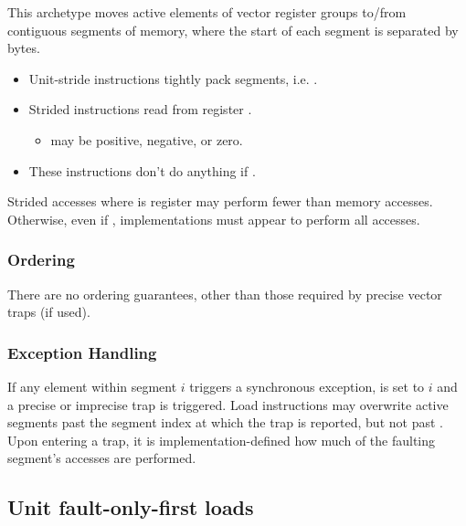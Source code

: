 \noindent
This archetype moves active elements of  vector register groups to/from contiguous segments of memory,
where the start of each segment is separated by  bytes.

\begin{itemize}
    \item Unit-stride instructions tightly pack segments, i.e. .
    \item Strided instructions read  from register .
    \begin{itemize}
        \item {} may be positive, negative, or zero.
    \end{itemize}
    \item These instructions don't do anything if .
\end{itemize}

Strided accesses where  is register  may perform fewer than  memory accesses.
Otherwise, even if , implementations must appear to perform all accesses.

\subsubsection*{Ordering}
There are no ordering guarantees, other than those required by precise vector traps (if used).

\subsubsection*{Exception Handling}
If any element within segment $i$ triggers a synchronous exception,  is set to $i$ and a precise or imprecise trap is triggered.
Load instructions may overwrite active segments past the segment index at which the trap is reported, but not past .\cite[Section 7.7]{specification-RVV-v1.0}
Upon entering a trap, it is implementation-defined how much of the faulting segment's accesses are performed.

\subsection{Unit fault-only-first loads}\label{chap:bg:sec:rvv:fof}

